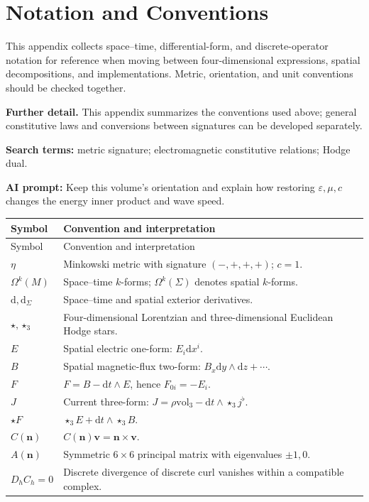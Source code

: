 \documentclass[11pt,openany]{book}
\numberwithin{equation}{chapter}
\theoremstyle{definition}
\theoremstyle{remark}
\newcommand{\dd}{\mathrm d}
\newcommand{\vol}{\mathrm{vol}}
\newcommand{\starS}{\star_3}
\newcommand{\studyroute}[3]{%
  \par\smallskip\noindent\textbf{Further detail.} #1\par
  \begingroup\raggedright\noindent\textbf{Search terms:} #2.\par\endgroup
  \noindent\textbf{AI prompt:} #3\par
}
\begin{document}
\chapter{Notation and Conventions}
\begin{chaptersummary}
This appendix collects space--time, differential-form, and discrete-operator notation for reference when moving between four-dimensional expressions, spatial decompositions, and implementations.
Metric, orientation, and unit conventions should be checked together.
\end{chaptersummary}
\studyroute{This appendix summarizes the conventions used above; general constitutive laws and conversions between signatures can be developed separately.}{metric signature; electromagnetic constitutive relations; Hodge dual}{Keep this volume's orientation and explain how restoring $\varepsilon,\mu,c$ changes the energy inner product and wave speed.}
\begin{longtable}{p{}p{}}
\toprule
Symbol & Convention and interpretation\\
\midrule
\endfirsthead
\toprule
Symbol & Convention and interpretation\\
\midrule
\endhead
$\eta$ & Minkowski metric with signature $(-,+,+,+)$; $c=1$.\\
$\Omega^k(M)$ & Space--time $k$-forms; $\Omega^k(\Sigma)$ denotes spatial $k$-forms.\\
$\dd,\dd_\Sigma$ & Space--time and spatial exterior derivatives.\\
$\star,\starS$ & Four-dimensional Lorentzian and three-dimensional Euclidean Hodge stars.\\
$E$ & Spatial electric one-form: $E_i\dd x^i$.\\
$B$ & Spatial magnetic-flux two-form: $B_x\dd y\wedge\dd z+\cdots$.\\
$F$ & $F=B-\dd t\wedge E$, hence $F_{0i}=-E_i$.\\
$J$ & Current three-form: $J=\rho\vol_3-\dd t\wedge\starS j^\flat$.\\
$\star F$ & $\starS E+\dd t\wedge\starS B$.\\
$C(\bm n)$ & $C(\bm n)\bm v=\bm n\times\bm v$.\\
$A(\bm n)$ & Symmetric $6\times6$ principal matrix with eigenvalues $\pm1,0$.\\
$D_hC_h=0$ & Discrete divergence of discrete curl vanishes within a compatible complex.\\
\bottomrule
\end{longtable}
\end{document}
